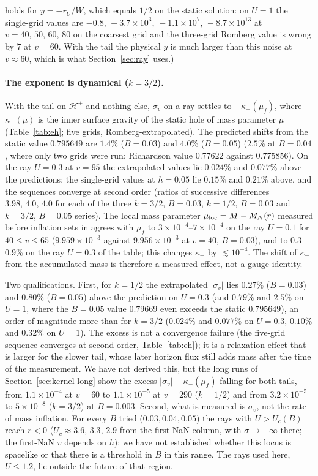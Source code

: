 \documentclass[11pt]{article}
\begin{document}
holds for $y=-r_U/\tilde W$, which equals $1/2$ on the static solution: on $U=1$ the single-grid values are $-0.8,\,-3.7\times10^{3},\,-1.1\times10^{7},\,-8.7\times10^{13}$ at $v=40,\,50,\,60,\,80$ on the coarsest grid and the three-grid Romberg value is wrong by $7$ at $v=60$. With the tail the physical $y$ is much larger than this noise at $v\approx60$, which is what Section~\ref{sec:ray} uses.)

\paragraph{The exponent is dynamical ($k=3/2$).} With the tail on $\mathcal H^+$ and nothing else, $\sigma_v$ on a ray settles to $-\kappa_-(\mu_f)$, where $\kappa_-(\mu)$ is the inner surface gravity of the static hole of mass parameter $\mu$ (Table~\ref{tab:eh}; five grids, Romberg-extrapolated). The predicted shifts from the static value $0.795649$ are $1.4\%$ ($B=0.03$) and $4.0\%$ ($B=0.05$) ($2.5\%$ at $B=0.04$, where only two grids were run: Richardson value $0.77622$ against $0.775856$). On the ray $U=0.3$ at $v=95$ the extrapolated values lie $0.024\%$ and $0.077\%$ above the predictions; the single-grid values at $h=0.05$ lie $0.15\%$ and $0.21\%$ above, and the sequences converge at second order (ratios of successive differences $3.98,\,4.0,\,4.0$ for each of the three $k=3/2$, $B=0.03$, $k=1/2$, $B=0.03$ and $k=3/2$, $B=0.05$ series). The local mass parameter $\mu_{\rm loc}=M-M_N(r)$ measured before inflation sets in agrees with $\mu_f$ to $3\times10^{-4}$--$7\times10^{-4}$ on the ray $U=0.1$ for $40\le v\le65$ ($9.959\times10^{-3}$ against $9.956\times10^{-3}$ at $v=40$, $B=0.03$), and to $0.3$--$0.9\%$ on the ray $U=0.3$ of the table; this changes $\kappa_-$ by $\lesssim10^{-4}$. The shift of $\kappa_-$ from the accumulated mass is therefore a measured effect, not a gauge identity.

Two qualifications. First, for $k=1/2$ the extrapolated $|\sigma_v|$ lies $0.27\%$ ($B=0.03$) and $0.80\%$ ($B=0.05$) above the prediction on $U=0.3$ (and $0.79\%$ and $2.5\%$ on $U=1$, where the $B=0.05$ value $0.79669$ even exceeds the static $0.795649$), an order of magnitude more than for $k=3/2$ ($0.024\%$ and $0.077\%$ on $U=0.3$, $0.10\%$ and $0.32\%$ on $U=1$). The excess is not a convergence failure (the five-grid sequence converges at second order, Table~\ref{tab:eh}); it is a relaxation effect that is larger for the slower tail, whose later horizon flux still adds mass after the time of the measurement. We have not derived this, but the long runs of Section~\ref{sec:kernel-long} show the excess $|\sigma_v|-\kappa_-(\mu_f)$ falling for both tails, from $1.1\times10^{-4}$ at $v=60$ to $1.1\times10^{-5}$ at $v=290$ ($k=1/2$) and from $3.2\times10^{-5}$ to $5\times10^{-8}$ ($k=3/2$) at $B=0.003$. Second, what is measured is $\sigma_v$, not the rate of mass inflation. For every $B$ tried ($0.03,0.04,0.05$) the rays with $U>U_c(B)$ reach $r<0$ ($U_c\approx3.6,\,3.3,\,2.9$ from the first NaN column, with $\sigma\to-\infty$ there; the first-NaN $v$ depends on $h$); we have not established whether this locus is spacelike or that there is a threshold in $B$ in this range. The rays used here, $U\le1.2$, lie outside the future of that region.
\end{document}
